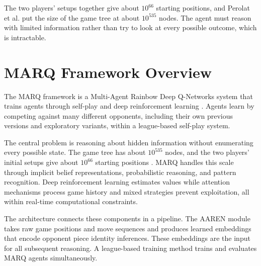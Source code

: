 The two players' setups together give about $10^{66}$ starting positions, and Perolat et al. \cite{perolat2022stratego} put the size of the game tree at about $10^{535}$ nodes. The agent must reason with limited information rather than try to look at every possible outcome, which is intractable.


\section{MARQ Framework Overview}

The MARQ framework is a Multi-Agent Rainbow Deep Q-Networks system that trains agents through self-play and deep reinforcement learning \cite{AlphaStratego}. Agents learn by competing against many different opponents, including their own previous versions and exploratory variants, within a league-based self-play system.

The central problem is reasoning about hidden information without enumerating every possible state. The game tree has about $10^{535}$ nodes, and the two players' initial setups give about $10^{66}$ starting positions \cite{perolat2022stratego}. MARQ handles this scale through implicit belief representations, probabilistic reasoning, and pattern recognition. Deep reinforcement learning estimates values while attention mechanisms process game history and mixed strategies prevent exploitation, all within real-time computational constraints.

The architecture connects these components in a pipeline. The AAREN module takes raw game positions and move sequences and produces learned embeddings that encode opponent piece identity inferences. These embeddings are the input for all subsequent reasoning. A league-based training method trains and evaluates MARQ agents simultaneously.



